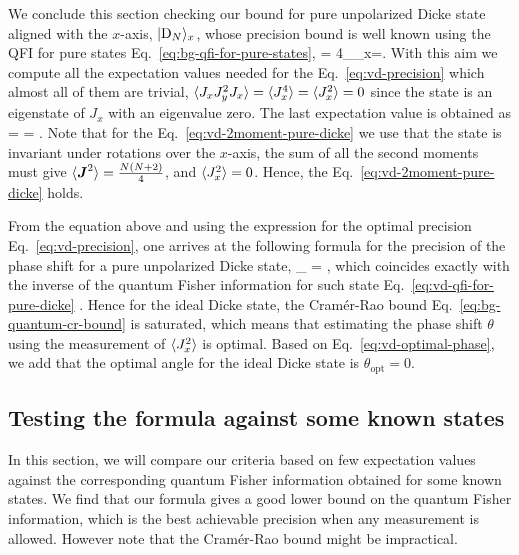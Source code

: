We conclude this section checking our bound for pure unpolarized Dicke state aligned with the $x$-axis, $\vert{\ensuremath{\textnormal{D}_{N}}}\rangle_x$, whose precision bound is well known using the QFI for pure states Eq.~\eqref{eq:bg-qfi-for-pure-states},
\be
   = 4_{_x}=.
  \label{eq:vd-qfi-for-pure-dicke}
\ee
With this aim we compute all the expectation values needed for the Eq.~\eqref{eq:vd-precision} which almost all of them are trivial, $\langle{J_xJ_y^2J_x}\rangle=\langle{J_x^4}\rangle=\langle{J_x^2}\rangle=0$ since the state is an eigenstate of $J_x$ with an eigenvalue zero.
The last expectation value is obtained as
\be
   =  = .
  \label{eq:vd-2moment-pure-dicke}
\ee
Note that for the Eq.~\eqref{eq:vd-2moment-pure-dicke} we use that the state is invariant under rotations over the $x$-axis, the sum of all the second moments must give $\langle{\ensuremath{\boldsymbol{J}}^2}\rangle = \frac{N (N+2)}{4}$, and $\langle{J_x^2}\rangle=0$.
Hence, the Eq.~\eqref{eq:vd-2moment-pure-dicke} holds.

From the equation above and using the expression for the optimal precision Eq.~\eqref{eq:vd-precision}, one arrives at the following formula for the precision of the phase shift for a pure unpolarized Dicke state,
\be
  \varian{\theta}_{} = ,
\ee
which coincides exactly with the inverse of the quantum Fisher information for such state Eq.~\eqref{eq:vd-qfi-for-pure-dicke} \cite{Luecke2011}.
Hence for the ideal Dicke state, the Cramér-Rao bound Eq.~\eqref{eq:bg-quantum-cr-bound} is saturated, which means that estimating the phase shift $\theta$ using the measurement of $\langle{J_x^2}\rangle$ is optimal.
Based on Eq.~\eqref{eq:vd-optimal-phase}, we add that the optimal angle for the ideal Dicke state is $\theta_{\text{opt}}=0$.

\subsection{Testing the formula against some known states}
\label{sec:vd-comparison-with-qfi}

In this section, we will compare our criteria based on few expectation values against the corresponding quantum Fisher information obtained for some known states.
We find that our formula gives a good lower bound on the quantum Fisher information, which is the best achievable precision when any measurement is allowed.
However note that the Cramér-Rao bound might be impractical.

